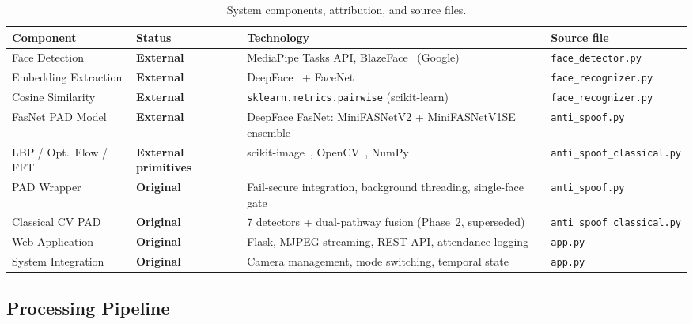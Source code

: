 \documentclass[11pt,a4paper]{article}
\begin{document}
\begin{table}[H]
\centering
\caption{System components, attribution, and source files.}
\label{tab:components}
\renewcommand{\arraystretch}{1.25}
\small
\setlength{\tabcolsep}{5pt}
\begin{tabular}{@{}p{2.8cm}p{3.2cm}p{5.6cm}p{3.6cm}@{}}
\toprule
\textbf{Component} & \textbf{Status} & \textbf{Technology} & \textbf{Source file} \\
\midrule
Face Detection
  & \textcolor{codered}{\bfseries External}
  & MediaPipe Tasks API, BlazeFace~\cite{bazarevsky2019blazeface} (Google)
  & \texttt{face\_detector.py} \\[3pt]
Embedding Extraction
  & \textcolor{codered}{\bfseries External}
  & DeepFace~\cite{serengil2021lightface} + FaceNet~\cite{schroff2015facenet}
  & \texttt{face\_recognizer.py} \\[3pt]
Cosine Similarity
  & \textcolor{codered}{\bfseries External}
  & \texttt{sklearn.metrics.pairwise} (scikit-learn)
  & \texttt{face\_recognizer.py} \\[3pt]
FasNet PAD Model
  & \textcolor{codered}{\bfseries External}
  & DeepFace FasNet: MiniFASNetV2 + MiniFASNetV1SE ensemble~\cite{liu2021minifasnet}
  & \texttt{anti\_spoof.py} \\[3pt]
LBP / Opt.\ Flow / FFT
  & \textcolor{codered}{\bfseries External primitives}
  & scikit-image~\cite{ojala2002multiresolution}, OpenCV~\cite{bradski2000opencv}, NumPy
  & \texttt{anti\_spoof\_\allowbreak classical.py} \\
\midrule
PAD Wrapper
  & \textcolor{codegreen}{\bfseries Original}
  & Fail-secure integration, background threading, single-face gate
  & \texttt{anti\_spoof.py} \\[3pt]
Classical CV PAD
  & \textcolor{codegreen}{\bfseries Original}
  & 7 detectors + dual-pathway fusion (Phase~2, superseded)
  & \texttt{anti\_spoof\_\allowbreak classical.py} \\[3pt]
Web Application
  & \textcolor{codegreen}{\bfseries Original}
  & Flask, MJPEG streaming, REST API, attendance logging
  & \texttt{app.py} \\[3pt]
System Integration
  & \textcolor{codegreen}{\bfseries Original}
  & Camera management, mode switching, temporal state
  & \texttt{app.py} \\
\bottomrule
\end{tabular}
\end{table}

\subsection{Processing Pipeline}
\end{document}
